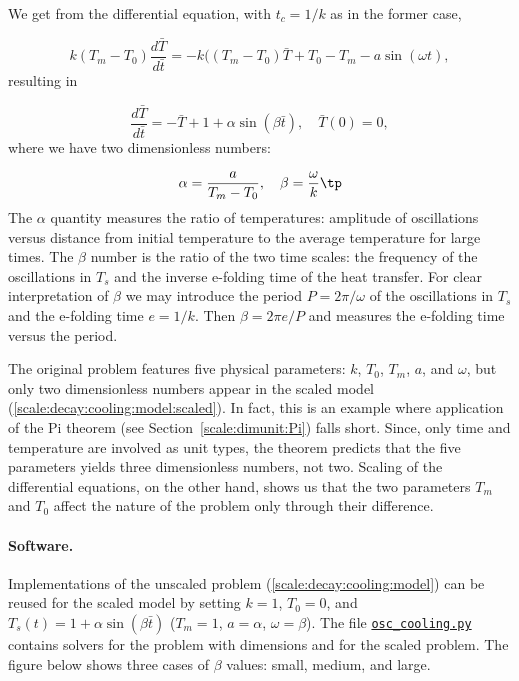 \documentclass[graybox,envcountchap,sectrefs,final]{svmonodo}
\newenvironment{notice_mdfboxadmon}[1][]{
\begin{notice_mdfboxmdframed}[frametitle=#1]
}
{
\end{notice_mdfboxmdframed}
}
\begin{document}
We get from the differential equation, with $t_c=1/k$ as in the former
case,

\[ k(T_m-T_0)\frac{d\bar T}{d\bar t} = -k((T_m-T_0)\bar T + T_0 - T_m - a
\sin(\omega t),\]
resulting in

\begin{equation}
\frac{d\bar T}{d\bar t} = -\bar T + 1 + \alpha\sin (\beta \bar t),\quad
\bar T(0)=0,
\label{scale:decay:cooling:model:scaled}
\end{equation}
where we have two dimensionless numbers:

\[ \alpha = \frac{a}{T_m-T_0},\quad \beta = \frac{\omega}{k}\tp\]
The $\alpha$ quantity measures the ratio of temperatures: amplitude of
oscillations versus distance from initial temperature to the average
temperature for large times.  The $\beta$ number is the ratio of the
two time scales: the frequency of the oscillations in $T_s$ and the
inverse e-folding time of the heat transfer. For clear interpretation
of $\beta$ we may introduce the period $P=2\pi/\omega$ of the
oscillations in $T_s$ and the e-folding time $e=1/k$. Then $\beta =
2\pi e/P$ and measures the e-folding time versus the period.


\begin{notice_mdfboxadmon}[Remark]
The original problem features five physical parameters: $k$, $T_0$,
$T_m$, $a$, and $\omega$, but only two dimensionless numbers appear in the
scaled model (\ref{scale:decay:cooling:model:scaled}).
In fact, this is an example where application of the Pi theorem
(see Section~\ref{scale:dimunit:Pi}) falls
short. Since, only time and temperature are involved as unit types, the
theorem predicts that the five parameters yields three dimensionless numbers,
not two. Scaling of the differential equations, on the other hand,
shows us that the two parameters
$T_m$ and $T_0$ affect the nature of the problem only through their difference.
\end{notice_mdfboxadmon}



\paragraph{Software.}
Implementations of the unscaled problem (\ref{scale:decay:cooling:model})
can be reused for the scaled model by setting $k=1$, $T_0=0$, and
$T_s(t) = 1 + \alpha\sin (\beta \bar t)$ ($T_m=1$, $a=\alpha$, $\omega =\beta$).
The file \href{{http://tinyurl.com/o8pb3yy/osc_cooling.py}}{\nolinkurl{osc_cooling.py}} contains
solvers for the problem with dimensions and
for the scaled problem. The figure below
shows three cases of $\beta$ values: small, medium, and large.
\end{document}
